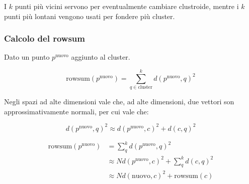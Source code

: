 \documentclass[\main/main.tex]{subfiles}
\begin{document}
I $k$ punti più vicini servono per eventualmente cambiare clustroide, mentre i $k$ punti più lontani vengono usati per fondere più cluster.

\subsubsection{Calcolo del rowsum}
Dato un punto $p^{\text{nuovo}}$ aggiunto al cluster.

\[
  \text{rowsum}\left(p^{\text{nuovo}}\right) = \sum_{q \in \text{cluster}}^k d\left(p^{\text{nuovo}}, q\right) ^2
\]

Negli spazi ad alte dimensioni vale che, ad alte dimensioni, due vettori son approssimativamente normali, per cui vale che:

\[
  d(p^{\text{nuovo}}, q)^2 \approx d(p^{\text{nuovo}}, c)^2 + d(c,q)^2
\]

\begin{align}
  \text{rowsum}(p^{\text{nuovo}})
    & = \sum_q^k d(p^{\text{nuovo}}, q)^2                    \\
    & \approx N d(p^{\text{nuovo}}, c)^2 + \sum_q^k d(c,q)^2 \\
    & \approx N d(\text{nuovo}, c)^2 + \text{rowsum}(c)
\end{align}
\end{document}
